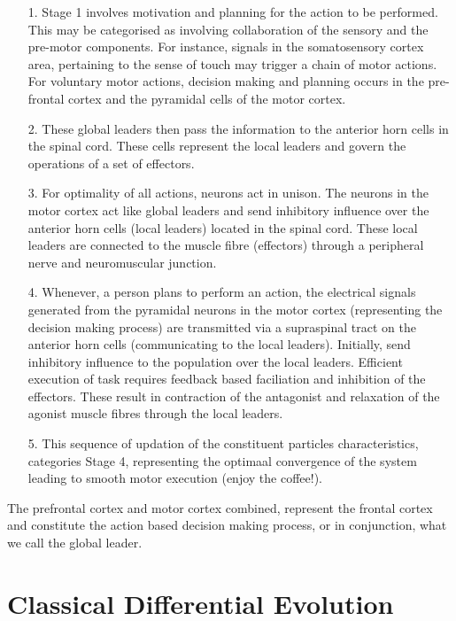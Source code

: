 \documentclass[conference]{IEEEtran}
\begin{document}
\begin{itemize}
\item[1.] Stage 1 involves motivation and planning for the action to be performed. This may be categorised as involving collaboration of the sensory and the pre-motor components. For instance, signals in the somatosensory cortex area, pertaining to the sense of touch may trigger a chain of motor actions. For voluntary motor actions, decision making and planning occurs in the pre-frontal cortex and the  pyramidal cells of the motor cortex.

\item[2.] These global leaders then pass the information to the anterior horn cells in the spinal cord. These cells represent the local leaders and govern the operations of a set of effectors.

\item[3.] For optimality of all actions, neurons act in unison. The neurons in the motor cortex act like global leaders and send inhibitory influence over the anterior horn cells (local leaders) located in the spinal cord. These local leaders are connected to the muscle fibre (effectors) through a peripheral nerve and neuromuscular junction.

\item[4.] Whenever, a person plans to perform an action, the electrical signals generated from the pyramidal neurons in the motor cortex (representing the decision making process) are transmitted via a supraspinal tract on the anterior horn cells (communicating to the local leaders). Initially, send inhibitory influence to the population over the local leaders. Efficient execution of task requires feedback based faciliation and inhibition of the effectors. These result in contraction of the antagonist and relaxation of the agonist muscle fibres through the local leaders.

\item[5.] This sequence of updation of the constituent particles characteristics, categories Stage 4, representing the optimaal convergence of the system leading to smooth motor execution (enjoy the coffee!).
\end{itemize}

The prefrontal cortex and motor cortex combined, represent the frontal cortex and constitute the action based decision making process, or in conjunction, what we call the global leader.


\section{Classical Differential Evolution}
\end{document}
